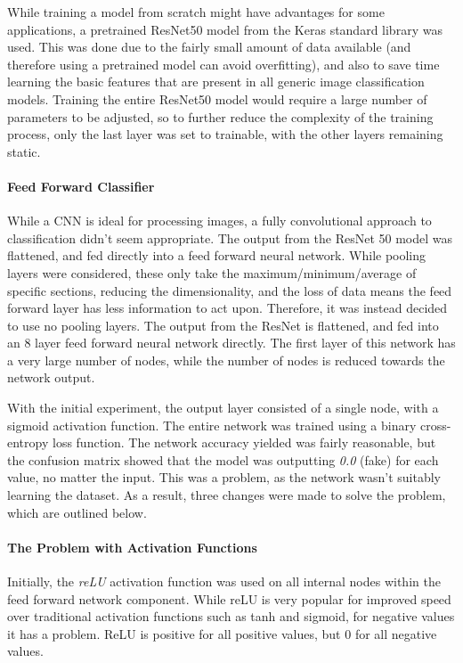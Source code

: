 \documentclass[10pt,a4paper]{article}
\begin{document}
                While training a model from scratch might have advantages for some applications, a pretrained ResNet50 model from the Keras standard library was used. This was done due to the fairly small amount of data
                available (and therefore using a pretrained model can avoid overfitting), and also to save time learning the basic features that are present in all generic image classification models. Training the entire
                ResNet50 model would require a large number of parameters to be adjusted, so to further reduce the complexity of the training process, only the last layer was set to trainable, with the other layers remaining static.


                \paragraph{Feed Forward Classifier}
                While a CNN is ideal for processing images, a fully convolutional approach to classification didn't seem appropriate. The output from the ResNet 50 model was flattened, and fed directly into a feed forward neural network.
                While pooling layers were considered, these only take the maximum/minimum/average of specific sections, reducing the dimensionality, and the loss of data means the feed forward layer has less information to act upon. Therefore,
                it was instead decided to use no pooling layers. The output from the ResNet is flattened, and fed into an 8 layer feed forward neural network directly. The first layer of this network has a very large number of nodes,
                while the number of nodes is reduced towards the network output.
                
                With the initial experiment, the output layer consisted of a single node, with a sigmoid activation function. The entire network was trained using a binary cross-entropy loss function. The network accuracy yielded was fairly reasonable,
                but the confusion matrix showed that the model was outputting \emph{0.0} (fake) for each value, no matter the input. This was a problem, as the network wasn't suitably learning the dataset. As a result, three changes were made to solve the problem, which are outlined below.
                
                \paragraph{The Problem with Activation Functions}
                Initially, the \emph{reLU} activation function was used on all internal nodes within the feed forward network component. While reLU is very popular for improved speed over traditional activation functions such as tanh and sigmoid,
                for negative values it has a problem. ReLU is positive for all positive values, but 0 for all negative values.
\end{document}
